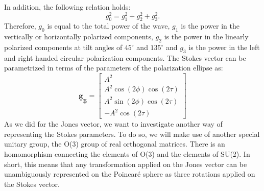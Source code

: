 \documentclass[11pt]{article}
\begin{document}
In addition, the following relation holds:
\begin{equation}
	g_{0}^{2} = g_{1}^{2} + g_{2}^{2} + g_{3}^{2}.
\end{equation}
Therefore, $g_{0}$ is equal to the total power of the wave, $g_{1}$ is the power in the vertically or horizontally polarized components, $g_{2}$ is the power in the linearly polarized components at tilt angles of $45^{\circ}$ and $135^{\circ}$ and $g_{3}$ is the power in the left and right handed circular polarization components. 
The Stokes vector can be parametrized in terms of the parameters of the polarization ellipse as:
\begin{equation}
	\mathbf{\underline{g}}_{\mathbf{\underline{E}}} = 
	\begin{bmatrix}
		A^{2}\\
		A^{2}\cos\left(2\phi\right)\cos\left(2\tau\right)\\
		A^{2}\sin\left(2\phi\right)\cos\left(2\tau\right)\\
		-A^{2}\cos\left(2\tau\right)
	\end{bmatrix}
\end{equation}
As we did for the Jones vector, we want to investigate another way of representing the Stokes parameters. To do so, we will make use of another special unitary group, the O(3) group of real orthogonal matrices. There is an homomorphism connecting the elements of O(3) and the elements of SU(2). In short, this means that any transformation applied on the Jones vector can be unambiguously represented on the Poincaré sphere as three rotations applied on the Stokes vector.
\end{document}
